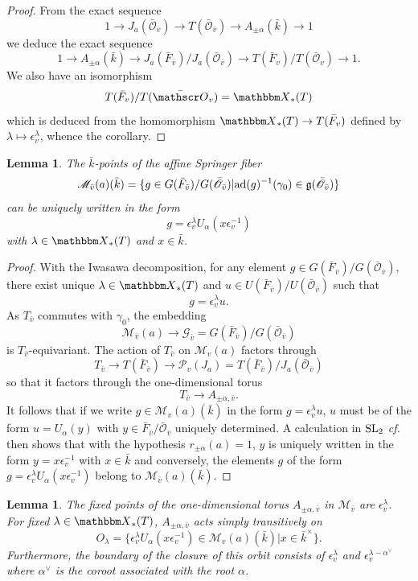 \documentclass[12pt,english]{smfart}
\numberwithin{equation}{subsection}
\newtheorem{lemme}[equation]{Lemma}
\theoremstyle{remark}
\newcommand\calP{{\mathscr P}}
\newcommand\calM{{\mathscr M}}
\newcommand\calO{{\mathscr O}}
\newcommand\calG{{\mathscr G}}
\newcommand\frakg{{\mathfrak g}}
\newcommand\bbX{{\mathbbm X}}
\newcommand\SL{{\rm SL}}
\newcommand\ad{{\rm ad}}
\newcommand\cf{{\it cf.\ }}
\begin{document}
\begin{proof}
From the exact sequence
$$1\rightarrow J_a(\bar\calO_{\bar v}) \rightarrow T(\bar\calO_{\bar v})\rightarrow
A_{\pm \alpha}(\bar k)\rightarrow 1
$$
we deduce the exact sequence
$$1 \rightarrow A_{\pm \alpha}(\bar k) \rightarrow J_a(\bar F_{\bar v})/J_a(\bar\calO_{\bar v})
\rightarrow T(\bar F_v)/T(\bar \calO_v) \rightarrow 1.
$$
We also have an isomorphism
$$T(\bar F_v)/T(\bar \calO_v)=\bbX_*(T)$$
which is deduced from the homomorphism $\bbX_*(T) \rightarrow T(\bar F_v)$
defined by $\lambda\mapsto \epsilon_v^\lambda$, whence the corollary.
\end{proof}

\begin{lemme}
The $\bar k$-points of the affine Springer fiber
$$\calM_{\bar v}(a)(\bar k)=\{g\in G(\bar F_{\bar v})/ G(\bar\calO_{\bar v})
| \ad(g)^{-1}(\gamma_0)\in \frakg(\bar\calO_{\bar v})\}
$$
can be uniquely written in the form
$$g=\epsilon_v^\lambda U_\alpha(x \epsilon_v^{-1}) $$
with $\lambda\in \bbX_*(T)$ and $x\in \bar k$.
\end{lemme}

\begin{proof}
With the Iwasawa decomposition, for any element $g\in G(\bar
F_{\bar v})/ G(\bar\calO_{\bar v})$, there exist unique $\lambda\in \bbX_*(T)$
and $u\in U(\bar F_{\bar v})/ U(\bar\calO_{\bar v})$ such that
$$g=\epsilon_v^\lambda u .$$
As $T_{\bar v}$ commutes with $\gamma_0$, the embedding
$$\calM_{\bar v}(a) \rightarrow \calG_{\bar v}=G(\bar F_{\bar
v})/ G(\bar\calO_{\bar v})
$$
is $T_{\bar v}$-equivariant. The action of $T_{\bar v}$ on $\calM_v(a)$
factors through
$$T_{\bar v} \rightarrow T(\bar F_{\bar v}) \rightarrow \calP_v(J_a)
=T(\bar F_{\bar v})/ J_a(\bar \calO_{\bar v})$$
so that it factors through the one-dimensional torus
$$T_{\bar v}\rightarrow A_{\pm \alpha, \bar v}.$$
It follows that if we write $g\in \calM_v(a)(\bar k)$ in the form
$g=\epsilon_v^\lambda u $, $u$ must be of the form $u=U_\alpha(y)$
with $y\in \bar F_{\bar v}/ \bar \calO_{\bar v}$ uniquely determined.
A calculation in $\SL_2$ \cf \cite[lemma 6.2]{GKM} then shows that with
the hypothesis $r_{\pm \alpha}(a)=1$, $y$ is uniquely written in the form
$y=x \epsilon_v^{-1}$ with $x\in \bar k$ and conversely, the elements $g$
of the form $g=\epsilon_v^\lambda U_\alpha(x \epsilon_v^{-1})$
belong to $\calM_{\bar v}(a)(\bar k)$.
\end{proof}

\begin{lemme}
The fixed points of the one-dimensional torus $A_{\pm \alpha,\bar v}$ in
$\calM_{\bar v}$ are $\epsilon_v^\lambda$. For fixed $\lambda\in \bbX_*(T)$,
$A_{\pm \alpha,\bar v}$ acts simply transitively on
$$O_\lambda=\{\epsilon_v^\lambda U_\alpha(x \epsilon_v^{-1}) \in \calM_v(a)(\bar k)
| x\in \bar k^\times\}.
$$
Furthermore, the boundary of the closure of this orbit consists of
$\epsilon_v^\lambda$ and $\epsilon_v^{\lambda-\alpha^\vee}$ where
$\alpha^\vee$ is the coroot associated with the root $\alpha$.
\end{lemme}
\end{document}
